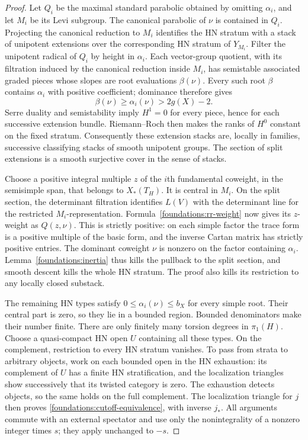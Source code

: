 \documentclass[11pt]{article}
\numberwithin{equation}{section}
\theoremstyle{definition}
\theoremstyle{remark}
\begin{document}
\begin{proof}
Let $Q_i$ be the maximal standard parabolic obtained by omitting
$\alpha_i$, and let $M_i$ be its Levi subgroup.  The canonical parabolic
of $\nu$ is contained in $Q_i$.  Projecting the canonical reduction to
$M_i$ identifies the HN stratum with a stack of unipotent extensions over
the corresponding HN stratum of $Y_{M_i}$.  Filter the unipotent radical
of $Q_i$ by height in $\alpha_i$.  Each vector-group quotient, with its
filtration induced by the canonical reduction inside $M_i$, has
semistable associated graded pieces whose slopes are root evaluations
$\beta(\nu)$.  Every such root $\beta$ contains $\alpha_i$ with positive
coefficient; dominance therefore gives
\[
 \beta(\nu)\geq\alpha_i(\nu)>2g(X)-2.
\]
Serre duality and semistability imply $H^1=0$ for every piece, hence for
each successive extension bundle.  Riemann--Roch then makes the ranks of
$H^0$ constant on the fixed stratum.  Consequently these extension stacks
are, locally in families, successive classifying stacks of smooth
unipotent groups.  The section of split extensions is a smooth
surjective cover in the sense of stacks.

Choose a positive integral multiple $z$ of the $i$th fundamental
coweight, in the semisimple span, that belongs to $X_*(T_H)$.  It is
central in $M_i$.  On the split section, the determinant filtration
identifies $L(V)$ with the determinant line for the restricted
$M_i$-representation.  Formula~\eqref{foundations:rr-weight} now gives
its $z$-weight as $Q(z,\nu)$.  This is strictly positive: on each simple
factor the trace form is a positive multiple of the basic form, and the
inverse Cartan matrix has strictly positive entries.  The dominant
coweight $\nu$ is nonzero on the factor containing $\alpha_i$.
Lemma~\ref{foundations:inertia} thus kills the pullback to the split
section, and smooth descent kills the whole HN stratum.  The proof also
kills its restriction to any locally closed substack.

The remaining HN types satisfy $0\leq\alpha_i(\nu)\leq b_X$ for every
simple root.  Their central part is zero, so they lie in a bounded
region.  Bounded denominators make their number finite.  There are only
finitely many torsion degrees in $\pi_1(H)$.  Choose a quasi-compact HN
open $U$ containing all these types.  On the complement, restriction to
every HN stratum vanishes.  To pass from strata to arbitrary objects,
work on each bounded open in the HN exhaustion: its complement of $U$
has a finite HN stratification, and the localization triangles show
successively that its twisted category is zero.  The exhaustion detects
objects, so the same holds on the full complement.  The localization
triangle for $j$ then proves \eqref{foundations:cutoff-equivalence}, with
inverse $j_*$.  All arguments commute with an external spectator and
use only the nonintegrality of a nonzero integer times $s$; they apply
unchanged to $-s$.
\end{proof}
\end{document}
